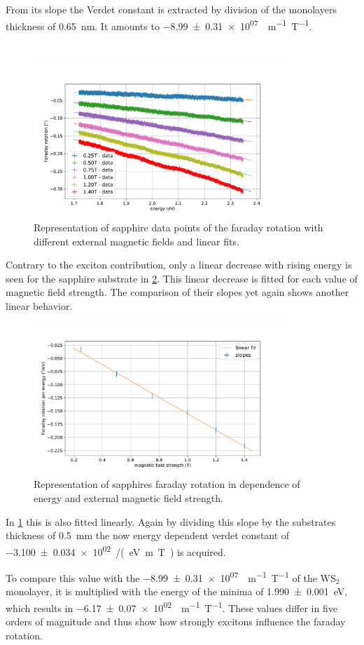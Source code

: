 From its slope the Verdet constant is extracted by division of the monolayers thickness of \SI{0.65}{\nano\meter}.
It amounts to \SI{-8.99+-0.31e+07}{\deg m^{-1} T^{-1}}.

\

\begin{figure}[!ht]
    \centering
    \includegraphics[width=0.85\textwidth]{plots/sapphire_lins.pdf}
    \caption{Representation of sapphire data points of the faraday rotation with different external magnetic fields and linear fits.}
    \label{fig_sapphire_lins}
\end{figure}
Contrary to the exciton contribution, only a linear decrease with rising energy is seen for the sapphire substrate in \cref{fig_sapphire_slopes}.
This linear decrease is fitted for each value of magnetic field strength.
The comparison of their slopes yet again shows another linear behavior.

\begin{figure}[!ht]
    \centering
    \includegraphics[width=0.85\textwidth]{plots/sapphire_slopes.pdf}
    \caption{Representation of sapphires faraday rotation in dependence of energy and external magnetic field strength.}
    \label{fig_sapphire_slopes}
\end{figure}
In \cref{fig_sapphire_lins} this is also fitted linearly.
Again by dividing this slope by the substrates thickness of \SI{0.5}{\milli\meter} the now energy dependent verdet constant of \SI{-3.100+-0.034e+02}{\deg /(eV m T)} is acquired.

To compare this value with the \SI{-8.99+-0.31e+07}{\deg m^{-1} T^{-1}} of the WS$_2$ monolayer, it is multiplied with the energy of the minima of \SI{1.990+-0.001}{\electronvolt}, which results in \SI{-6.17+-0.07e+02}{\deg m^{-1} T^{-1}}.
These values differ in five orders of magnitude and thus show how strongly excitons influence the faraday rotation.
